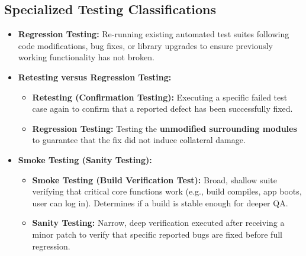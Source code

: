 \subsection{Specialized Testing Classifications}
\begin{itemize}
    \item \textbf{Regression Testing:} Re-running existing automated test suites following code modifications, bug fixes, or library upgrades to ensure previously working functionality has not broken.
    \item \textbf{Retesting versus Regression Testing:}
    \begin{itemize}
        \item \textbf{Retesting (Confirmation Testing):} Executing a specific failed test case again to confirm that a reported defect has been successfully fixed.
        \item \textbf{Regression Testing:} Testing the \textbf{unmodified surrounding modules} to guarantee that the fix did not induce collateral damage.
    \end{itemize}
    \item \textbf{Smoke Testing (Sanity Testing):}
    \begin{itemize}
        \item \textbf{Smoke Testing (Build Verification Test):} Broad, shallow suite verifying that critical core functions work (e.g., build compiles, app boots, user can log in). Determines if a build is stable enough for deeper QA.
        \item \textbf{Sanity Testing:} Narrow, deep verification executed after receiving a minor patch to verify that specific reported bugs are fixed before full regression.
    \end{itemize}
\end{itemize}


